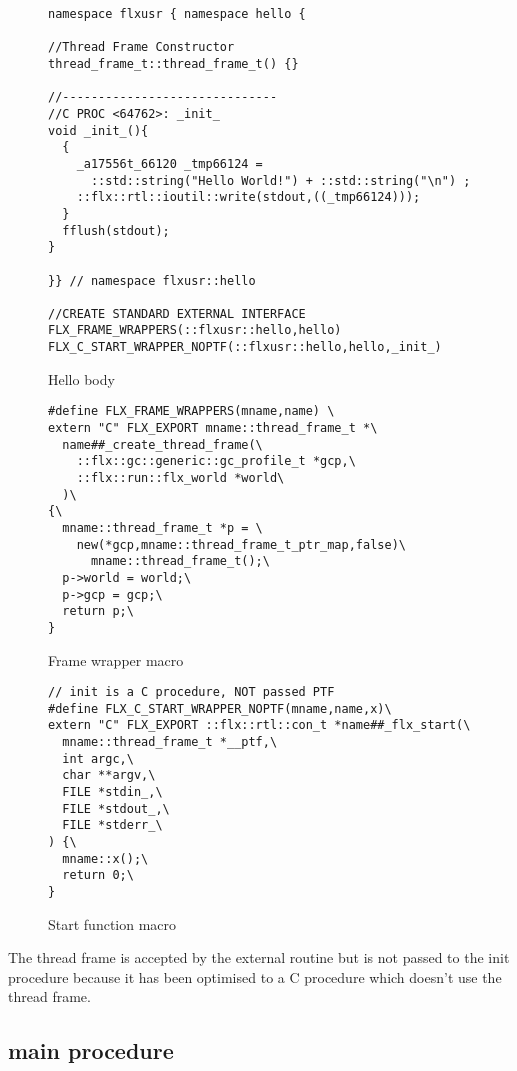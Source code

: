 \documentclass[oneside]{book}
\begin{document}
\begin{figure}[p]
\caption{Hello body\label{Hello body}}
\begin{verbatim}
namespace flxusr { namespace hello {

//Thread Frame Constructor
thread_frame_t::thread_frame_t() {}

//------------------------------
//C PROC <64762>: _init_
void _init_(){
  {
    _a17556t_66120 _tmp66124 = 
      ::std::string("Hello World!") + ::std::string("\n") ;
    ::flx::rtl::ioutil::write(stdout,((_tmp66124)));
  }
  fflush(stdout);
}

}} // namespace flxusr::hello

//CREATE STANDARD EXTERNAL INTERFACE
FLX_FRAME_WRAPPERS(::flxusr::hello,hello)
FLX_C_START_WRAPPER_NOPTF(::flxusr::hello,hello,_init_)

\end{verbatim}
\end{figure}
\begin{figure}[p]
\caption{Frame wrapper macro\label{frame wrapper macro}}
\begin{verbatim}
#define FLX_FRAME_WRAPPERS(mname,name) \
extern "C" FLX_EXPORT mname::thread_frame_t *\
  name##_create_thread_frame(\
    ::flx::gc::generic::gc_profile_t *gcp,\
    ::flx::run::flx_world *world\
  )\
{\
  mname::thread_frame_t *p = \
    new(*gcp,mname::thread_frame_t_ptr_map,false)\
      mname::thread_frame_t();\
  p->world = world;\
  p->gcp = gcp;\
  return p;\
}
\end{verbatim}
\end{figure}

\begin{figure}[p]
\caption{Start function macro\label{start function macro}}
\begin{verbatim}
// init is a C procedure, NOT passed PTF
#define FLX_C_START_WRAPPER_NOPTF(mname,name,x)\
extern "C" FLX_EXPORT ::flx::rtl::con_t *name##_flx_start(\
  mname::thread_frame_t *__ptf,\
  int argc,\
  char **argv,\
  FILE *stdin_,\
  FILE *stdout_,\
  FILE *stderr_\
) {\
  mname::x();\
  return 0;\
}
\end{verbatim}
\end{figure}

The thread frame is accepted by the
external routine but is not passed to the init procedure because it
has been optimised to a C procedure which doesn't use the thread frame.


\subsection{main procedure}
\end{document}
